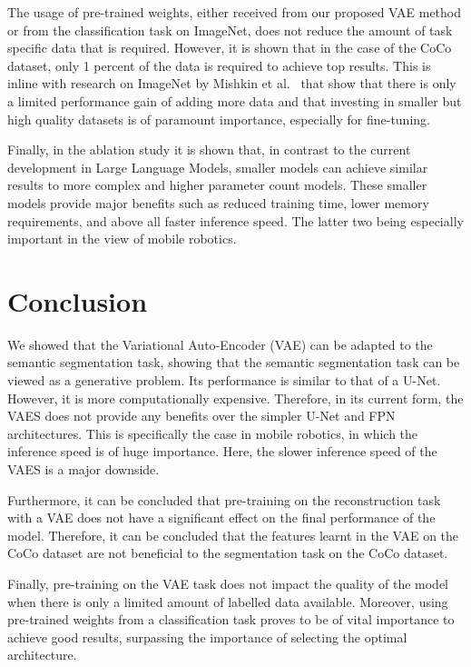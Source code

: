 The usage of pre-trained weights, either received from our proposed VAE method or from the classification task on ImageNet, does not reduce the amount of task specific data that is required. However, it is shown that in the case of the CoCo dataset, only 1 percent of the data is required to achieve top results. This is inline with research on ImageNet by Mishkin et al.~\cite{mishkin2017systematic} that show that there is only a limited performance gain of adding more data and that investing in smaller but high quality datasets is of paramount importance, especially for fine-tuning.

Finally, in the ablation study it is shown that, in contrast to the current development in Large Language Models, smaller models can achieve similar results to more complex and higher parameter count models. These smaller models provide major benefits such as reduced training time, lower memory requirements, and above all faster inference speed. The latter two being especially important in the view of mobile robotics.

\section{Conclusion}\label{chapter:conclusions}

We showed that the Variational Auto-Encoder (VAE) can be adapted to the semantic segmentation task, showing that the semantic segmentation task can be viewed as a generative problem. Its performance is similar to that of a U-Net. However, it is more computationally expensive. Therefore, in its current form, the VAES does not provide any benefits over the simpler U-Net and FPN architectures. This is specifically the case in mobile robotics, in which the inference speed is of huge importance. Here, the slower inference speed of the VAES is a major downside.

Furthermore, it can be concluded that pre-training on the reconstruction task with a VAE does not have a significant effect on the final performance of the model. Therefore, it can be concluded that the features learnt in the VAE on the CoCo dataset are not beneficial to the segmentation task on the CoCo dataset.

Finally, pre-training on the VAE task does not impact the quality of the model when there is only a limited amount of labelled data available. Moreover, using pre-trained weights from a classification task proves to be of vital importance to achieve good results, surpassing the importance of selecting the optimal architecture.
